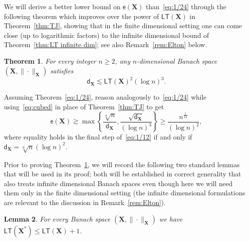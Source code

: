 \documentclass[11pt,reqno]{amsart}
\renewcommand{\le}{\leqslant}
\renewcommand{\ge}{\geqslant}
\newcommand{\dd}{\mathsf{d}}
\newcommand{\X}{\mathbf X}
\newtheorem{theorem}{Theorem}
\newtheorem{lemma}[theorem]{Lemma}
\theoremstyle{remark}
\newcommand{\ee}{\mathsf{e}}
\renewcommand{\1}{\mathbf 1}
\newcommand{\LT}{\mathsf{LT}}
\begin{document}
We will derive a better lower bound on $\ee(\X)$ than~\eqref{eq:1/24} through the following theorem which improves over the power of $\LT(\X)$ in Theorem~\ref{thm:TJ}, showing that in the finite dimensional setting one can come close (up to logarithmic factors) to the infinite dimensional bound of Theorem~\ref{thm:LT infinite dim}; see also Remark~\ref{rem:Elton} below.




\begin{theorem}\label{thm:LT finite with log} For every integer $n\ge 2$,  any $n$-dimensional Banach space $(\X,\|\cdot\|_{\X})$ satisfies
\begin{equation}\label{eq:cubed}
\dd_{\X}\lesssim \LT(\X)^2(\log n)^3.
\end{equation}
\end{theorem}
Assuming Theorem~\ref{eq:1/24}, reason analogously to~\eqref{eq:1/24} while using~\eqref{eq:cubed} in place of Theorem~\ref{thm:TJ} to get
\begin{equation}\label{eq:1/12}
\ee(\X)\gtrsim \max \left\{\frac{\sqrt[4]{n}}{\dd_{\X}},\frac{\sqrt{\dd_{\X}}}{(\log n)^3}\right\}\ge \frac{n^{\frac{1}{12}}}{(\log n)^{2}},
\end{equation}
where equality holds in the final step of~\eqref{eq:1/12} if and only if  $\dd_\X=\sqrt[6]{n}(\log n)^{2}$.


Prior to proving Theorem~\ref{thm:LT finite with log}, we will record the following two standard lemmas that will be used in its proof; both will be established in correct generality that also treats infinite dimensional Banach spaces even though here we will need them only in the finite dimensional setting (the infinite dimensional formulations are relevant to the discussion in Remark~\ref{rem:Elton}).

\begin{lemma}\label{lem:LT+1} For every Banach space $(\X,\|\cdot\|_{\X})$ we have $\LT(\X^*)\le \LT(\X)+1$.
\end{lemma}
\end{document}
